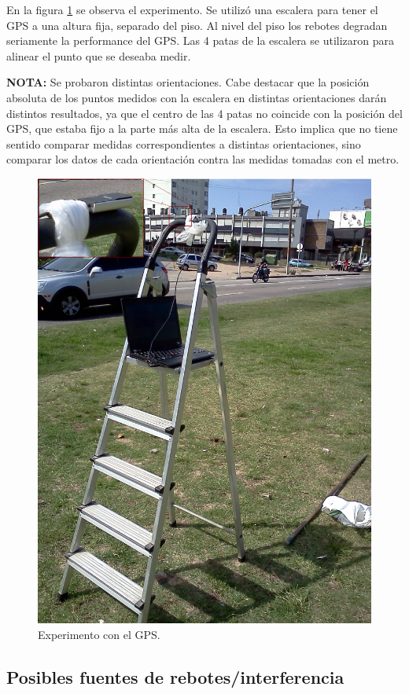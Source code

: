 \documentclass[spanish,12pt,a4paper,titlepage]{report}
\begin{document}
En la figura \ref{fig:gps_setup.png} se observa el experimento. Se utilizó una escalera para tener el GPS a una altura fija, separado del piso. Al nivel del piso los rebotes degradan seriamente la performance del GPS. Las 4 patas de la escalera se utilizaron para alinear el punto que se deseaba medir.

\textbf{NOTA:} Se probaron distintas orientaciones. Cabe destacar que la posición absoluta de los puntos medidos con la escalera en distintas orientaciones darán distintos resultados, ya que el centro de las 4 patas no coincide con la posición del GPS, que estaba fijo a la parte más alta de la escalera. Esto implica que no tiene sentido comparar medidas correspondientes a distintas orientaciones, sino comparar los datos de cada orientación contra las medidas tomadas con el metro.

\begin{figure}[h!]
  \begin{center}
  \includegraphics[width=.7\textwidth]{./img/gps_setup.png}
  \end{center}
  \caption{Experimento con el GPS.}
  \label{fig:gps_setup.png}
\end{figure}

\newpage

\subsection{Posibles fuentes de rebotes/interferencia}
\label{sec:posibles-fuentes-de-rebotes-interferencia}
\end{document}
